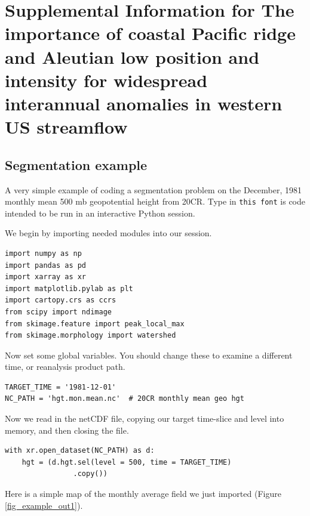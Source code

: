 \documentclass[final, double]{ua-thesis}
\begin{document}
\chapter{Supplemental Information for The importance of coastal Pacific ridge and Aleutian low position and intensity for widespread interannual anomalies in western US streamflow}

\section{Segmentation example}

A very simple example of coding a segmentation problem on the December, 1981 monthly mean 500 mb geopotential height from 20CR. Type in \verb|this font| is code intended to be run in an interactive Python session.

We begin by importing needed modules into our session.

\begin{singlespacing}
\begin{verbatim}
import numpy as np
import pandas as pd
import xarray as xr
import matplotlib.pylab as plt
import cartopy.crs as ccrs
from scipy import ndimage
from skimage.feature import peak_local_max
from skimage.morphology import watershed
\end{verbatim}
\end{singlespacing}

 Now set some global variables. You should change these to examine a different time, or reanalysis product path.

\begin{singlespacing}
\begin{verbatim}
TARGET_TIME = '1981-12-01'
NC_PATH = 'hgt.mon.mean.nc'  # 20CR monthly mean geo hgt
\end{verbatim}
\end{singlespacing}

Now we read in the netCDF file, copying our target time-slice and level into memory, and then closing the file.

\begin{singlespacing}
\begin{verbatim}
with xr.open_dataset(NC_PATH) as d:
    hgt = (d.hgt.sel(level = 500, time = TARGET_TIME)
                .copy())
\end{verbatim}
\end{singlespacing}

Here is a simple map of the monthly average field we just imported (Figure \ref{fig_example_out1}).
\end{document}
